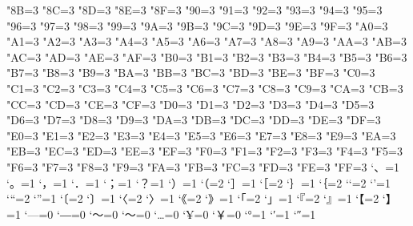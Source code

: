 \xspcode"8B=3
\xspcode"8C=3
\xspcode"8D=3
\xspcode"8E=3
\xspcode"8F=3
\xspcode"90=3
\xspcode"91=3
\xspcode"92=3
\xspcode"93=3
\xspcode"94=3
\xspcode"95=3
\xspcode"96=3
\xspcode"97=3
\xspcode"98=3
\xspcode"99=3
\xspcode"9A=3
\xspcode"9B=3
\xspcode"9C=3
\xspcode"9D=3
\xspcode"9E=3
\xspcode"9F=3
\xspcode"A0=3
\xspcode"A1=3
\xspcode"A2=3
\xspcode"A3=3
\xspcode"A4=3
\xspcode"A5=3
\xspcode"A6=3
\xspcode"A7=3
\xspcode"A8=3
\xspcode"A9=3
\xspcode"AA=3
\xspcode"AB=3
\xspcode"AC=3
\xspcode"AD=3
\xspcode"AE=3
\xspcode"AF=3
\xspcode"B0=3
\xspcode"B1=3
\xspcode"B2=3
\xspcode"B3=3
\xspcode"B4=3
\xspcode"B5=3
\xspcode"B6=3
\xspcode"B7=3
\xspcode"B8=3
\xspcode"B9=3
\xspcode"BA=3
\xspcode"BB=3
\xspcode"BC=3
\xspcode"BD=3
\xspcode"BE=3
\xspcode"BF=3
\xspcode"C0=3
\xspcode"C1=3
\xspcode"C2=3
\xspcode"C3=3
\xspcode"C4=3
\xspcode"C5=3
\xspcode"C6=3
\xspcode"C7=3
\xspcode"C8=3
\xspcode"C9=3
\xspcode"CA=3
\xspcode"CB=3
\xspcode"CC=3
\xspcode"CD=3
\xspcode"CE=3
\xspcode"CF=3
\xspcode"D0=3
\xspcode"D1=3
\xspcode"D2=3
\xspcode"D3=3
\xspcode"D4=3
\xspcode"D5=3
\xspcode"D6=3
\xspcode"D7=3
\xspcode"D8=3
\xspcode"D9=3
\xspcode"DA=3
\xspcode"DB=3
\xspcode"DC=3
\xspcode"DD=3
\xspcode"DE=3
\xspcode"DF=3
\xspcode"E0=3
\xspcode"E1=3
\xspcode"E2=3
\xspcode"E3=3
\xspcode"E4=3
\xspcode"E5=3
\xspcode"E6=3
\xspcode"E7=3
\xspcode"E8=3
\xspcode"E9=3
\xspcode"EA=3
\xspcode"EB=3
\xspcode"EC=3
\xspcode"ED=3
\xspcode"EE=3
\xspcode"EF=3
\xspcode"F0=3
\xspcode"F1=3
\xspcode"F2=3
\xspcode"F3=3
\xspcode"F4=3
\xspcode"F5=3
\xspcode"F6=3
\xspcode"F7=3
\xspcode"F8=3
\xspcode"F9=3
\xspcode"FA=3
\xspcode"FB=3
\xspcode"FC=3
\xspcode"FD=3
\xspcode"FE=3
\xspcode"FF=3
\inhibitxspcode`、=1
\inhibitxspcode`。=1
\inhibitxspcode`，=1
\inhibitxspcode`．=1
\inhibitxspcode`；=1
\inhibitxspcode`？=1
\inhibitxspcode`）=1
\inhibitxspcode`（=2
\inhibitxspcode`］=1
\inhibitxspcode`［=2
\inhibitxspcode`｝=1
\inhibitxspcode`｛=2
\inhibitxspcode`‘=2
\inhibitxspcode`’=1
\inhibitxspcode`“=2
\inhibitxspcode`”=1
\inhibitxspcode`〔=2
\inhibitxspcode`〕=1
\inhibitxspcode`〈=2
\inhibitxspcode`〉=1
\inhibitxspcode`《=2
\inhibitxspcode`》=1
\inhibitxspcode`「=2
\inhibitxspcode`」=1
\inhibitxspcode`『=2
\inhibitxspcode`』=1
\inhibitxspcode`【=2
\inhibitxspcode`】=1
\inhibitxspcode`—=0%
\inhibitxspcode`―=0%
\inhibitxspcode`〜=0%
\inhibitxspcode`～=0%
\inhibitxspcode`…=0
\inhibitxspcode`¥=0%
\inhibitxspcode`￥=0%
\inhibitxspcode`°=1
\inhibitxspcode`′=1
\inhibitxspcode`″=1
